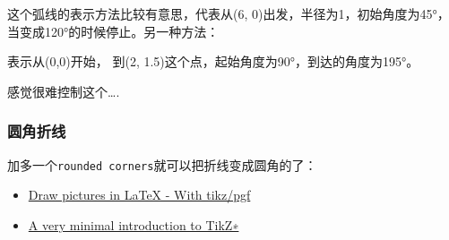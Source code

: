\documentclass[12pt]{article}
\begin{document}
这个弧线的表示方法比较有意思，代表从(6, 0)出发，半径为1，初始角度为45°，当变成120°的时候停止。另一种方法：

\begin{Shaded}
\begin{Highlighting}[]
\end{Highlighting}
\end{Shaded}

表示从(0,0)开始， 到(2, 1.5)这个点，起始角度为90°，到达的角度为195°。

感觉很难控制这个\ldots.

\subsubsection{圆角折线}\label{ux5706ux89d2ux6298ux7ebf}

加多一个\texttt{rounded\ corners}就可以把折线变成圆角的了：

\begin{Shaded}
\begin{Highlighting}[]
\end{Highlighting}
\end{Shaded}

\begin{itemize}
\tightlist
\item
  \href{https://www.latex-tutorial.com/tutorials/tikz/}{Draw pictures in LaTeX - With tikz/pgf}
\item
  \href{http://cremeronline.com/LaTeX/minimaltikz.pdf}{A very minimal introduction to TikZ∗}
\end{itemize}
\end{document}
